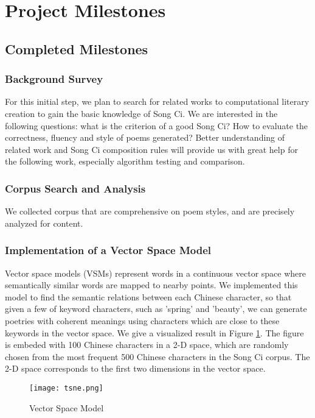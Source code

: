 \section{Project Milestones} 

\subsection{Completed Milestones} 
%
\subsubsection{Background Survey}
 For this initial step, we plan to search for related works to computational literary creation to gain the basic knowledge of Song Ci.
%
We are interested in the following questions: what is the criterion of a good Song Ci? How to evaluate the correctness, fluency and style of poems generated?
%
Better understanding of related work and Song Ci composition rules will provide us with great help for the following work, especially algorithm testing and comparison. 
%
\subsubsection {Corpus Search and Analysis}
%

We collected corpus that are comprehensive on poem styles, and are precisely analyzed for content. 

%
\subsubsection{ Implementation of a Vector Space Model }
Vector space models (VSMs) represent words in a continuous vector space where semantically similar words are mapped to nearby points.
%
We implemented this model to find the semantic relations between each Chinese character, so that given a few of keyword characters, such as 'spring' and 'beauty', we can generate poetries with coherent meanings using characters which are close to these keywords in the vector space.
%
%
We give a visualized result in Figure \ref{fig:VSM}. The figure is embeded with 100 Chinese characters in a 2-D space, which are randomly chosen from the most frequent 500 Chinese characters in the Song Ci corpus. The 2-D space corresponds to the first two dimensions in the vector space.
\begin{figure}[htbp]
	\centering
	\texttt{[image: tsne.png]}
	\caption{Vector Space Model}
	\label{fig:VSM}	
\end{figure} 
